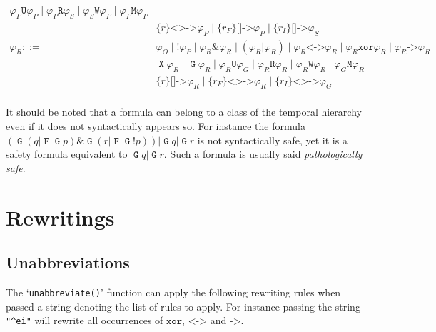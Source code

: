 \documentclass[a4paper,twoside,10pt,DIV=12]{scrreprt}
\DeclareMathOperator{\F}{\texttt{F}}
\DeclareMathOperator{\G}{\texttt{G}}
\newcommand{\U}{\mathbin{\texttt{U}}}
\newcommand{\R}{\mathbin{\texttt{R}}}
\DeclareMathOperator{\X}{\texttt{X}}
\newcommand{\M}{\mathbin{\texttt{M}}}
\newcommand{\W}{\mathbin{\texttt{W}}}
\DeclareMathOperator{\NOT}{\texttt{!}}
\newcommand{\XOR}{\mathbin{\texttt{xor}}}
\newcommand{\IMPLIES}{\mathbin{\texttt{->}}}
\newcommand{\EQUIV}{\mathbin{\texttt{<->}}}
\newcommand{\OR}{\mathbin{\texttt{|}}}
\newcommand{\AND}{\mathbin{\texttt{\&}}}
\newcommand{\0}{\texttt{0}}
\newcommand{\1}{\texttt{1}}
\newcommand{\Esuffix}{\texttt{<>->}}
\newcommand{\Asuffix}{\texttt{[]->}}
\newcommand{\sere}[1]{\texttt{\{}#1\texttt{\}}}
\begin{document}
\begin{align*}
                   \varphi_P\U\varphi_P\mid\varphi_P\R\varphi_S\mid
                   \varphi_S\W\varphi_P\mid\varphi_P\M\varphi_P\\
           \mid{}& \sere{r}\Esuffix \varphi_P\mid
                   \sere{r_F}\Asuffix \varphi_P\mid
                   \sere{r_I}\Asuffix \varphi_S\\
  \varphi_R ::={}& \varphi_O \mid \NOT\varphi_P\mid
                   \varphi_R\AND \varphi_R\mid (\varphi_R\OR \varphi_R)\mid
                   \varphi_R\EQUIV \varphi_R\mid \varphi_R\XOR \varphi_R\mid
                   \varphi_R\IMPLIES \varphi_R\\
           \mid{}& \X\varphi_R \mid \G\varphi_R \mid
                   \varphi_R\U\varphi_G\mid\varphi_R\R\varphi_R\mid
                   \varphi_R\W\varphi_R\mid\varphi_G\M\varphi_R\\
           \mid{}& \sere{r}\Asuffix \varphi_R\mid \sere{r_F}\Esuffix \varphi_R \mid \sere{r_I}\Esuffix \varphi_G\\
\end{align*}

It should be noted that a formula can belong to a class of the
temporal hierarchy even if it does not syntactically appears so.  For
instance the formula $(\G(q\OR \F\G p)\AND \G(r\OR \F\G\NOT p))\OR\G
q\OR \G r$ is not syntactically safe, yet it is a safety formula
equivalent to $\G q\OR \G r$.  Such a formula is usually said
\emph{pathologically safe}.

\chapter{Rewritings}

\section{Unabbreviations}\label{sec:unabbrev}

The `\verb=unabbreviate()=' function can apply the following rewriting
rules when passed a string denoting the list of rules to apply.  For
instance passing the string \texttt{"\^{}ei"} will rewrite all
occurrences of $\XOR$, $\EQUIV$ and $\IMPLIES$.
\end{document}
